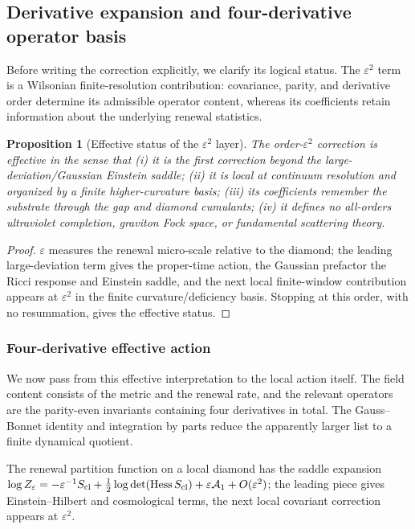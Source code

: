 \documentclass[11pt]{article}
\newtheorem{proposition}[theorem]{Proposition}
\theoremstyle{definition}
\theoremstyle{remark}
\newcommand{\eps}{\varepsilon}
\begin{document}
\subsection{Derivative expansion and four-derivative operator basis}
\label{subsec:qg-effective}

Before writing the correction explicitly, we clarify its logical status.  The
$\eps^2$ term is a Wilsonian finite-resolution contribution: covariance,
parity, and derivative order determine its admissible operator content, whereas
its coefficients retain information about the underlying renewal statistics.

\begin{proposition}[Effective status of the \(\eps^2\) layer]
\label{prop:effective-qg}
The order-$\eps^2$ correction is effective in the sense that \textup{(i)} it is the
first correction beyond the large-deviation/Gaussian Einstein saddle; \textup{(ii)}
it is local at continuum resolution and organized by a finite higher-curvature
basis; \textup{(iii)} its coefficients remember the substrate through the gap and
diamond cumulants; \textup{(iv)} it defines no all-orders ultraviolet completion,
graviton Fock space, or fundamental scattering theory.
\end{proposition}

\begin{proof}
$\eps$ measures the renewal micro-scale relative to the diamond; the leading
large-deviation term gives the proper-time action, the Gaussian prefactor the Ricci
response and Einstein saddle, and the next local finite-window contribution appears
at $\eps^2$ in the finite curvature/deficiency basis.  Stopping at this order, with
no resummation, gives the effective status.
\end{proof}

\subsubsection{Four-derivative effective action}

We now pass from this effective interpretation to the local action itself.  The
field content consists of the metric and the renewal rate, and the relevant
operators are the parity-even invariants containing four derivatives in total.
The Gauss--Bonnet identity and integration by parts reduce the apparently larger
list to a finite dynamical quotient.

The renewal partition function on a local diamond has the saddle expansion
$\log Z_\eps=-\eps^{-1}S_{\rm cl}+\tfrac12\log\det(\operatorname{Hess}S_{\rm cl})
+\eps\mathcal A_1+O(\eps^2)$; the leading piece gives Einstein--Hilbert and
cosmological terms, the next local covariant correction appears at $\eps^2$.
\end{document}
